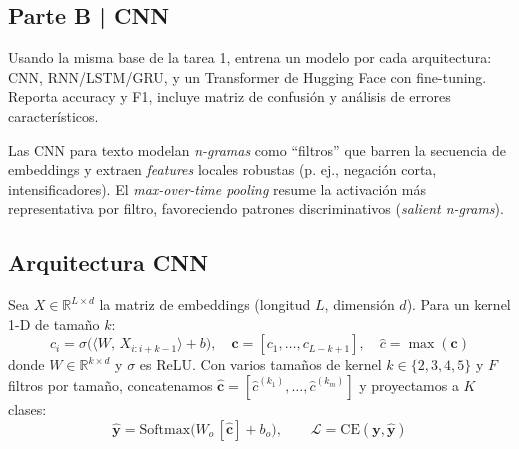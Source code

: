 \newpage

\begin{myblock}
\section*{Parte B | CNN}

    Usando la misma base de la tarea 1, entrena un modelo por cada arquitectura: 
    CNN, RNN/LSTM/GRU, y un Transformer de Hugging Face con fine-tuning. Reporta
    accuracy y F1, incluye matriz de confusión y análisis de errores característicos.  

\end{myblock}



Las CNN para texto modelan \emph{n-gramas} como “filtros” que barren la secuencia de 
embeddings y extraen \emph{features} locales robustas (p. ej., negación corta, 
intensificadores). El \emph{max-over-time pooling} resume la activación más representativa 
por filtro, favoreciendo patrones discriminativos (\textit{salient n-grams}).

\subsection{Arquitectura CNN}

Sea $X \in \mathbb{R}^{L \times d}$ la matriz de embeddings (longitud $L$, dimensión $d$). Para un kernel 1-D de tamaño $k$:
\[
c_i = \sigma\!\big(\langle W,\, X_{i:i+k-1} \rangle + b\big), \quad
\mathbf{c} = [c_1,\dots,c_{L-k+1}], \quad
\hat{c} = \max(\mathbf{c})
\]
donde $W \in \mathbb{R}^{k \times d}$ y $\sigma$ es ReLU. Con varios tamaños de kernel $k \in \{2,3,4,5\}$ y $F$ filtros por tamaño, concatenamos 
$\hat{\mathbf{c}} = [\hat{c}^{(k_1)}, \ldots, \hat{c}^{(k_m)}]$ y proyectamos a $K$ clases:
\[
\hat{\mathbf{y}}=\mathrm{Softmax}\!\big(W_o \,[\hat{\mathbf{c}}] + b_o\big),\qquad
\mathcal{L} = \mathrm{CE}(\mathbf{y}, \hat{\mathbf{y}})
\]

